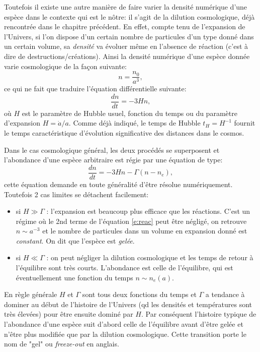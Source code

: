 Toutefois il existe une autre manière de faire varier la densité numérique d'une espèce dans le contexte qui est le nôtre: il s'agit de la dilution cosmologique, déjà rencontrée dans le chapitre précédent. En effet, compte tenu de l'expansion de l'Univers, si l'on dispose d'un certain nombre de particules d'un type donné dans un certain volume, sa \textit{densité} va évoluer même en l'absence de réaction (c'est à dire de destructions/créations). Ainsi la densité numérique d'une espèce donnée varie cosmologique de la façon suivante:
\begin{equation}
n=\frac{n_0}{a^3},
\end{equation}
ce qui ne fait que traduire l'équation différentielle suivante:
\begin{equation}
\frac{dn}{dt}=-3Hn,
\end{equation}
où $H$ est le paramètre de Hubble usuel, fonction du temps ou du paramètre d'expansion $H=\dot a/a$. Comme déjà indiqué, le temps de Hubble $t_H=H^{-1}$ fournit le temps caractéristique d'évolution significative des distances dans le cosmos.

Dans le cas cosmologique général, les deux procédés se superposent et l'abondance d'une espèce arbitraire est régie par une équation de type:
\begin{equation}
\frac{dn}{dt}=-3Hn-\Gamma (n-n_e),
\label{e:reac}
\end{equation}
cette équation demande en toute généralité d'être résolue numériquement. Toutefois 2 cas limites se détachent facilement:
\begin{itemize}
\item si $H\gg \Gamma$ : l'expansion est beaucoup plus efficace que les réactions. C'est un régime où le 2nd terme de l'équation \ref{e:reac} peut être négligé, on retrouve $n\sim a^{-3}$ et le nombre de particules dans un volume en expansion donné est \textit{constant}. On dit que l'espèce est \textit{gelée}.
\item si $H\ll \Gamma$ : on peut négliger la dilution cosmologique et les temps de retour à l'équilibre sont très courts. L'abondance est celle de l'équilibre, qui est éventuellement une fonction du temps $n\sim n_e(a)$.
\end{itemize}

En règle générale $H$ et $\Gamma$ sont tous deux fonctions du temps et $\Gamma$ a tendance à dominer au début de l'histoire de l'Univers (qd les densités et températures sont très élevées) pour être ensuite dominé par $H$. Par conséquent l'histoire typique de l'abondance d'une espèce suit d'abord celle de l'équilibre avant d'être gelée et n'être plus modifiée que par la dilution cosmologique. Cette transition porte le nom de "gel" ou \textit{freeze-out} en anglais.

